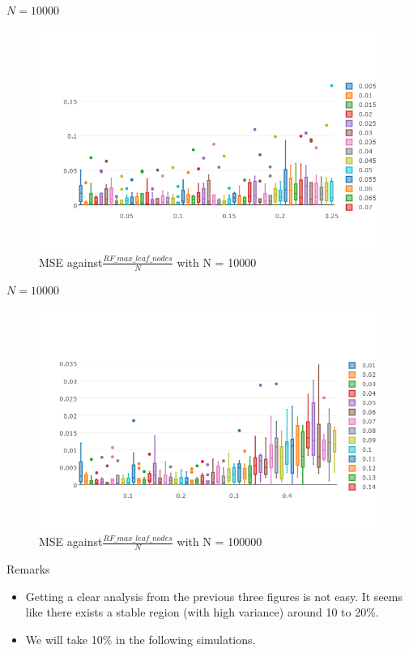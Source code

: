 \documentclass[10pt]{beamer}
\begin{document}
\begin{frame}{$N = 10000$}
	
	
	\begin{figure}
	\includegraphics[scale=0.36]{max_leaf_10000.png}
	\caption{MSE against$\frac{RF\_max\_leaf\_nodes }{N}$  with N = 10000}
	\end{figure}
\end{frame}

\begin{frame}{$N = 10000$}
	
	\centering
	\begin{figure}
		
	\includegraphics[scale=0.4]{max_leaf_100000.png}
	\caption{MSE against$\frac{RF\_max\_leaf\_nodes }{N}$  with N = 100000}
	
	\end{figure}
\end{frame}

\begin{frame}{Remarks}
	\begin{itemize}
		\item Getting a clear analysis from the previous three figures is not easy. It seems like there exists a stable region (with high variance) around 10 to 20\%. 
		\item We will take 10\% in the following simulations.
	\end{itemize}
\end{frame}
\end{document}
